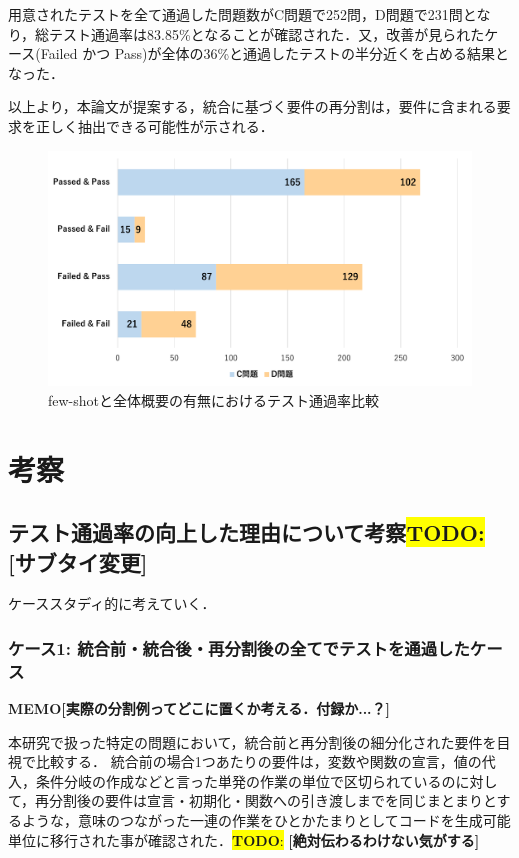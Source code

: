\documentclass[submit,techrep,noauthor]{ipsj}
\newcommand{\todo}[1]{\colorbox{yellow}{{\bf TODO}:}{\color{red} {\textbf{[#1]}}}}
\newcommand{\memo}[1]{\colorbox{magenta!30}{\textbf{MEMO}}{\color{red!50}\textbf{[#1]}}}
\begin{document}
用意されたテストを全て通過した問題数がC問題で252問，D問題で231問となり，総テスト通過率は83.85\%となることが確認された．又，改善が見られたケース(Failed かつ Pass)が全体の36\%と通過したテストの半分近くを占める結果となった．

以上より，本論文が提案する，統合に基づく要件の再分割は，要件に含まれる要求を正しく抽出できる可能性が示される．

\begin{figure}[t]
    \centering
    \includegraphics[width=1.0\linewidth]{./Toyoshima_fig/RQ3_1.pdf}
    \caption{few-shotと全体概要の有無におけるテスト通過率比較\protect\footnotemark}
    \label{rq3_1}
\end{figure}

\section{考察}
\label{sec:discussion}
\subsection{テスト通過率の向上した理由について考察\todo{サブタイ変更}}
ケーススタディ的に考えていく．


\subsubsection{ケース1: 統合前・統合後・再分割後の全てでテストを通過したケース}
\memo{実際の分割例ってどこに置くか考える．付録か...？}

本研究で扱った特定の問題において，統合前と再分割後の細分化された要件を目視で比較する．
統合前の場合1つあたりの要件は，変数や関数の宣言，値の代入，条件分岐の作成などと言った単発の作業の単位で区切られているのに対して，再分割後の要件は宣言・初期化・関数への引き渡しまでを同じまとまりとするような，意味のつながった一連の作業をひとかたまりとしてコードを生成可能単位に移行された事が確認された．\todo{絶対伝わるわけない気がする}
\end{document}
